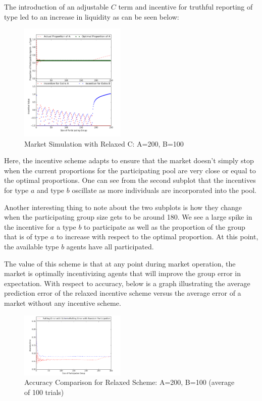 \documentclass[twoside,twocolumn]{article}
\begin{document}
The introduction of an adjustable $C$ term and incentive for truthful reporting of type led to an increase in liquidity as can be seen below:

\begin{figure}[h]
\centering
\includegraphics[width=0.45\textwidth]{figure_3.png}
\caption{Market Simulation with Relaxed C: A=200, B=100}
\end{figure}

Here, the incentive scheme adapts to ensure that the market doesn't simply stop when the current proportions for the participating pool are very close or equal to the optimal proportions. One can see from the second subplot that the incentives for type $a$ and type $b$ oscillate as more individuals are incorporated into the pool.

Another interesting thing to note about the two subplots is how they change when the participating group size gets to be around 180. We see a large spike in the incentive for a type $b$ to participate as well as the proportion of the group that is of type $a$ to increase with respect to the optimal proportion. At this point, the available type $b$ agents have all participated.

The value of this scheme is that at any point during market operation, the market is optimally incentivizing agents that will improve the group error in expectation. With respect to accuracy, below is a graph illustrating the average prediction error of the relaxed incentive scheme versus the average error of a market without any incentive scheme.

\begin{figure}[h]
\centering
\includegraphics[width=0.45\textwidth]{figure_5.png}
\caption{Accuracy Comparison for Relaxed Scheme: A=200, B=100 (average of 100 trials)}
\end{figure}
\end{document}
